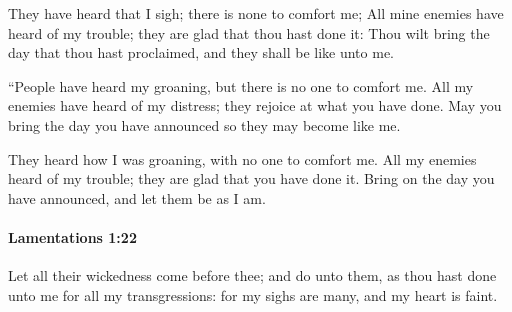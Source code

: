 			\begin{versebox}
					\item[BHS] 
					\item[LXX] 
					\item[ASV] They have heard that I sigh; there is none to comfort me; All mine enemies have heard of my trouble; they are glad that thou hast done it: Thou wilt bring the day that thou hast proclaimed, and they shall be like unto me.
					\item[NIV] “People have heard my groaning, but there is no one to comfort me. All my enemies have heard of my distress; they rejoice at what you have done. May you bring the day you have announced so they may become like me.
					\item[NRSV] They heard how I was groaning, with no one to comfort me. All my enemies heard of my trouble; they are glad that you have done it. Bring on the day you have announced, and let them be as I am.
			\end{versebox}

		\paragraph{Lamentations 1:22} %
			\label{LAMENTATIONS-1-22}

			Let all their wickedness come before thee; and do unto them, as thou hast done unto me for all my transgressions: for my sighs are many, and my heart is faint.

